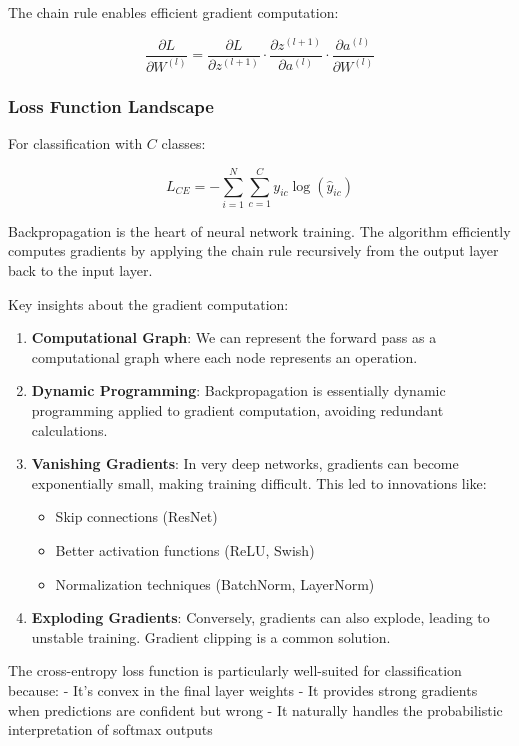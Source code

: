 \documentclass[
  11pt,
  letterpaper,
]{article}
\providecommand{\tightlist}{%
  \setlength{\itemsep}{0pt}\setlength{\parskip}{0pt}}
\begin{document}
The chain rule enables efficient gradient computation:

\[\frac{\partial L}{\partial W^{(l)}} = \frac{\partial L}{\partial z^{(l+1)}} \cdot \frac{\partial z^{(l+1)}}{\partial a^{(l)}} \cdot \frac{\partial a^{(l)}}{\partial W^{(l)}}\]

\subsubsection{Loss Function Landscape}\label{loss-function-landscape}

For classification with \(C\) classes:

\[L_{CE} = -\sum_{i=1}^{N} \sum_{c=1}^{C} y_{ic} \log(\hat{y}_{ic})\]

Backpropagation is the heart of neural network training. The algorithm
efficiently computes gradients by applying the chain rule recursively
from the output layer back to the input layer.

Key insights about the gradient computation:

\begin{enumerate}
\def\labelenumi{\arabic{enumi}.}
\item
  \textbf{Computational Graph}: We can represent the forward pass as a
  computational graph where each node represents an operation.
\item
  \textbf{Dynamic Programming}: Backpropagation is essentially dynamic
  programming applied to gradient computation, avoiding redundant
  calculations.
\item
  \textbf{Vanishing Gradients}: In very deep networks, gradients can
  become exponentially small, making training difficult. This led to
  innovations like:

  \begin{itemize}
  \tightlist
  \item
    Skip connections (ResNet)
  \item
    Better activation functions (ReLU, Swish)
  \item
    Normalization techniques (BatchNorm, LayerNorm)
  \end{itemize}
\item
  \textbf{Exploding Gradients}: Conversely, gradients can also explode,
  leading to unstable training. Gradient clipping is a common solution.
\end{enumerate}

The cross-entropy loss function is particularly well-suited for
classification because: - It's convex in the final layer weights - It
provides strong gradients when predictions are confident but wrong - It
naturally handles the probabilistic interpretation of softmax outputs
\end{document}
